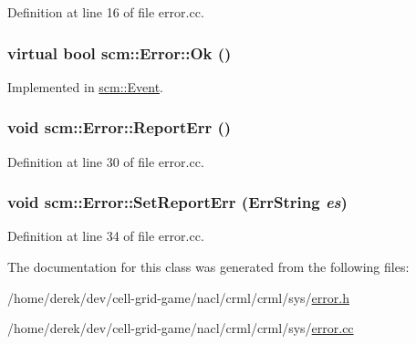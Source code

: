 Definition at line 16 of file error.cc.

\hypertarget{classscm_1_1_error_a2660b73f9671be3f286bed9d622a926a}{
\subsubsection[{Ok}]{\setlength{\rightskip}{0pt plus 5cm}virtual bool scm::Error::Ok ()}}
\label{classscm_1_1_error_a2660b73f9671be3f286bed9d622a926a}


Implemented in \hyperlink{classscm_1_1_event_a95400a0d0218dfb664c028d1130a5d14}{scm::Event}.

\hypertarget{classscm_1_1_error_a4dc4a630569665a615a0bfb321b65238}{
\subsubsection[{ReportErr}]{\setlength{\rightskip}{0pt plus 5cm}void scm::Error::ReportErr ()}}
\label{classscm_1_1_error_a4dc4a630569665a615a0bfb321b65238}


Definition at line 30 of file error.cc.

\hypertarget{classscm_1_1_error_ace08c93643469a92cb3ca1e0fb1ca583}{
\subsubsection[{SetReportErr}]{\setlength{\rightskip}{0pt plus 5cm}void scm::Error::SetReportErr ({\bf ErrString} {\em es})}}
\label{classscm_1_1_error_ace08c93643469a92cb3ca1e0fb1ca583}


Definition at line 34 of file error.cc.



The documentation for this class was generated from the following files:\begin{DoxyCompactItemize}
\item 
/home/derek/dev/cell-\/grid-\/game/nacl/crml/crml/sys/\hyperlink{error_8h}{error.h}\item 
/home/derek/dev/cell-\/grid-\/game/nacl/crml/crml/sys/\hyperlink{error_8cc}{error.cc}\end{DoxyCompactItemize}
